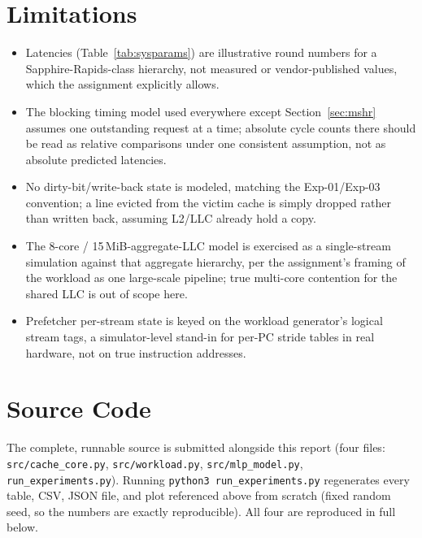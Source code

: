 \documentclass[11pt]{article}
\begin{document}
\section{Limitations}

\begin{itemize}[leftmargin=1.6em]
\item Latencies (Table~\ref{tab:sysparams}) are illustrative round numbers
for a Sapphire-Rapids-class hierarchy, not measured or vendor-published
values, which the assignment explicitly allows.
\item The blocking timing model used everywhere except Section~\ref{sec:mshr}
assumes one outstanding request at a time; absolute cycle counts there
should be read as relative comparisons under one consistent assumption, not
as absolute predicted latencies.
\item No dirty-bit/write-back state is modeled, matching the Exp-01/Exp-03
convention; a line evicted from the victim cache is simply dropped rather
than written back, assuming L2/LLC already hold a copy.
\item The 8-core / 15\,MiB-aggregate-LLC model is exercised as a
single-stream simulation against that aggregate hierarchy, per the
assignment's framing of the workload as one large-scale pipeline; true
multi-core contention for the shared LLC is out of scope here.
\item Prefetcher per-stream state is keyed on the workload generator's
logical stream tags, a simulator-level stand-in for per-PC stride tables in
real hardware, not on true instruction addresses.
\end{itemize}

\appendix
\section{Source Code}

The complete, runnable source is submitted alongside this report (four
files: \texttt{src/cache\_core.py}, \texttt{src/workload.py},
\texttt{src/mlp\_model.py}, \texttt{run\_experiments.py}). Running
\texttt{python3 run\_experiments.py} regenerates every table, CSV, JSON
file, and plot referenced above from scratch (fixed random seed, so the
numbers are exactly reproducible). All four are reproduced in full below.





\end{document}

